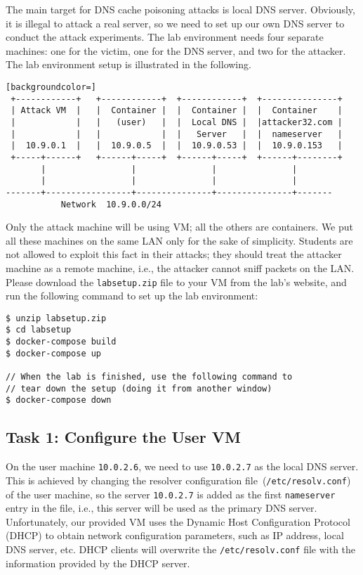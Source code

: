 The main target for DNS cache poisoning attacks is
local DNS server.  Obviously, it
is illegal to attack a real server, so we need to set up our own DNS
server to  conduct the attack experiments. The lab
environment needs four separate machines:
one for the victim, one for the DNS server, and two for the attacker.
The lab environment setup is illustrated in the following.

\begin{lstlisting}[backgroundcolor=]
 +------------+   +------------+  +------------+  +---------------+
 | Attack VM  |   |  Container |  |  Container |  |  Container    |
 |            |   |   (user)   |  |  Local DNS |  |attacker32.com |
 |            |   |            |  |   Server   |  |  nameserver   |
 |  10.9.0.1  |   |  10.9.0.5  |  |  10.9.0.53 |  |  10.9.0.153   |
 +-----+------+   +------+-----+  +------+-----+  +------+--------+
       |                 |               |               |
       |                 |               |               |
-------+-----------------+---------------+---------------+-------
           Network  10.9.0.0/24

\end{lstlisting}

Only the attack machine will be using VM; all the others are containers. 
We put all these machines on the same LAN only for the sake of simplicity. 
Students are not allowed to exploit this fact in their attacks; 
they should treat the attacker machine as a remote machine, 
i.e., the attacker cannot sniff packets on the LAN.
Please download the
\texttt{labsetup.zip} file to your VM from the lab's website,
and run the following
command to set up the lab environment:


\begin{lstlisting}
$ unzip labsetup.zip
$ cd labsetup
$ docker-compose build
$ docker-compose up

// When the lab is finished, use the following command to
// tear down the setup (doing it from another window)
$ docker-compose down
\end{lstlisting}


\subsection{Task 1: Configure the User VM} 
\label{subsec:user_machine}


On the user machine {\tt 10.0.2.6}, we need to use
{\tt 10.0.2.7} as the local DNS server.
This is achieved by changing
the resolver configuration file~(\texttt{/etc/resolv.conf}) of the user machine,
so the server \texttt{10.0.2.7} is added as the first \texttt{nameserver} entry in the file, i.e.,
this server will be used as the primary DNS server.
Unfortunately, our provided VM uses the Dynamic Host Configuration Protocol (DHCP) to obtain
network configuration parameters, such as IP address, local DNS server, etc.
DHCP clients will overwrite the \texttt{/etc/resolv.conf} file with the information
provided by the DHCP server.


